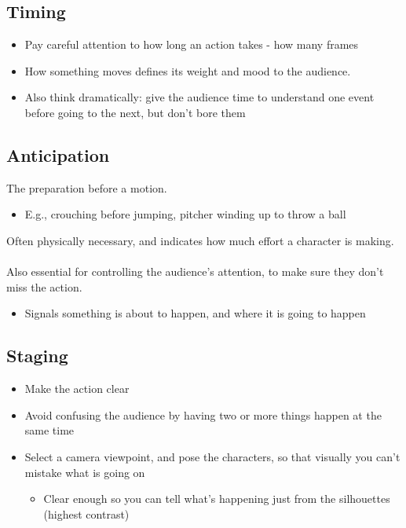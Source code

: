 \documentclass{article}
\begin{document}
\subsection*{Timing}
\begin{itemize}
    \item Pay careful attention to how long an action takes - how many frames
    \item How something moves defines its weight and mood to the audience.
    \item Also think dramatically: give the audience time to understand one event before going to the next, but don't bore them
\end{itemize}

\subsection*{Anticipation}
The preparation before a motion.
\begin{itemize}
    \item E.g., crouching before jumping, pitcher winding up to throw a ball
\end{itemize}
Often physically necessary, and indicates how much effort a character is making.\\\\
Also essential for controlling the audience's attention, to make sure they don't miss the action.
\begin{itemize}
    \item Signals something is about to happen, and where it is going to happen
\end{itemize}

\subsection*{Staging}
\begin{itemize}
    \item Make the action clear
    \item Avoid confusing the audience by having two or more things happen at the same time
    \item Select a camera viewpoint, and pose the characters, so that visually you can't mistake what is going on
    \begin{itemize}
        \item Clear enough so you can tell what's happening just from the silhouettes (highest contrast)
    \end{itemize}
\end{itemize}
\end{document}
